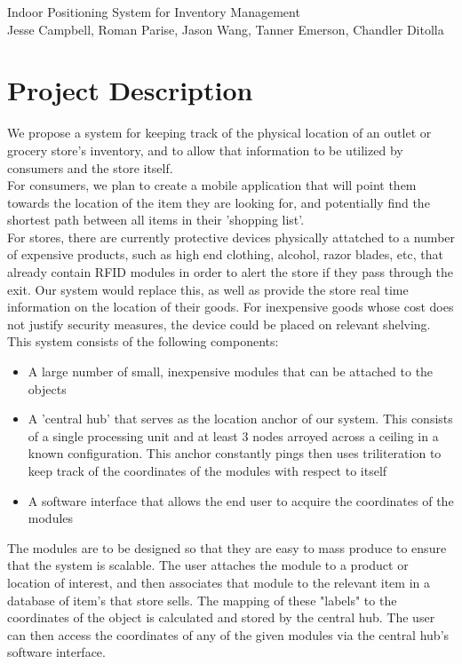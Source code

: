\documentclass{article}
\begin{document}
\begin{center}
{\Large Indoor Positioning System for Inventory Management} \\
{\small Jesse Campbell, Roman Parise, Jason Wang, Tanner Emerson, Chandler Ditolla}
\end{center}
\section{Project Description}
We propose a system for keeping track of the physical location of an outlet or grocery store's inventory, and to allow that information to be utilized by consumers and the store itself. \\
For consumers, we plan to create a mobile application that will point them towards the location of the item they are looking for, and potentially find the shortest path between all items in their 'shopping list'. \\
For stores, there are currently protective devices physically attatched to a number of expensive products, such as high end clothing, alcohol, razor blades, etc, that already contain RFID modules in order to alert the store if they pass through the exit. Our system would replace this, as well as provide the store real time information on the location of their goods. For inexpensive goods whose cost does not justify security measures, the device could be placed on relevant shelving.\\
This system consists of the following components:
\begin{itemize}
\item A large number of small, inexpensive modules that can be attached to the objects \\
\item A 'central hub' that serves as the location anchor of our system. This consists of a single processing unit and at least 3 nodes arroyed across a ceiling in a known configuration. This anchor constantly pings then uses triliteration to keep track of the coordinates of the modules with respect to itself \\
\item A software interface that allows the end user to acquire the coordinates of the modules \\
\end{itemize}
The modules are to be designed so that they are easy to mass produce to ensure that the system is scalable.
The user attaches the module to a product or location of interest, and then associates that module to the relevant item in a database of item's that store sells.
The mapping of these "labels" to the coordinates of the object is calculated and stored by the central hub.
The user can then access the coordinates of any of the given modules via the central hub's software interface.
\end{document}

